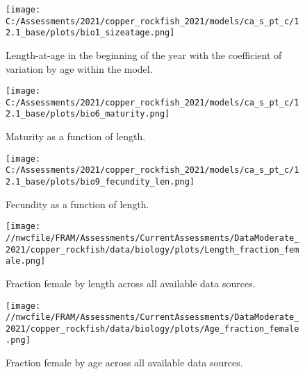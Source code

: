 \documentclass[11pt,
  english,
  a4paper,
]{article}
\begin{document}
\begin{figure}
\centering
\texttt{[image: C:/Assessments/2021/copper\_rockfish\_2021/models/ca\_s\_pt\_c/12.1\_base/plots/bio1\_sizeatage.png]}
\caption{Length-at-age in the beginning of the year with the coefficient of variation by age within the model.\label{fig:len-age-ss}}
\end{figure}

\tagmcend\tagstructend


\begin{figure}
\centering
\texttt{[image: C:/Assessments/2021/copper\_rockfish\_2021/models/ca\_s\_pt\_c/12.1\_base/plots/bio6\_maturity.png]}
\caption{Maturity as a function of length.\label{fig:maturity}}
\end{figure}

\tagmcend\tagstructend


\begin{figure}
\centering
\texttt{[image: C:/Assessments/2021/copper\_rockfish\_2021/models/ca\_s\_pt\_c/12.1\_base/plots/bio9\_fecundity\_len.png]}
\caption{Fecundity as a function of length.\label{fig:fecundity}}
\end{figure}

\tagmcend\tagstructend


\begin{figure}
\centering
\texttt{[image: //nwcfile/FRAM/Assessments/CurrentAssessments/DataModerate\_2021/copper\_rockfish/data/biology/plots/Length\_fraction\_female.png]}
\caption{Fraction female by length across all available data sources.\label{fig:len-sex-ratio}}
\end{figure}

\tagmcend\tagstructend


\begin{figure}
\centering
\texttt{[image: //nwcfile/FRAM/Assessments/CurrentAssessments/DataModerate\_2021/copper\_rockfish/data/biology/plots/Age\_fraction\_female.png]}
\caption{Fraction female by age across all available data sources.\label{fig:age-sex-ratio}}
\end{figure}
\end{document}
